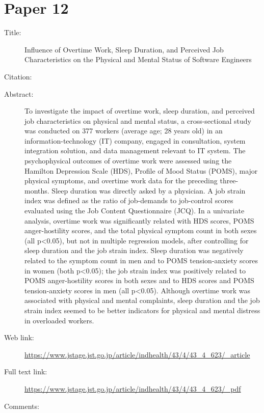 \documentclass{scrartcl}
\begin{document}
\section*{Paper 12}
\begin{description}
\item[Title:] Influence of Overtime Work, Sleep Duration, and Perceived Job Characteristics on the Physical and Mental Status of Software Engineers
\item[Citation:] \cite{nishikitani2005influence}
\item[Abstract:]
To investigate the impact of overtime work, sleep duration, and perceived job characteristics on physical and mental status, a cross-sectional study was conducted on 377 workers (average age; 28 years old) in an information-technology (IT) company, engaged in consultation, system integration solution, and data management relevant to IT system. The psychophysical outcomes of overtime work were assessed using the Hamilton Depression Scale (HDS), Profile of Mood Status (POMS), major physical symptoms, and overtime work data for the preceding three-months. Sleep duration was directly asked by a physician. A job strain index was defined as the ratio of job-demands to job-control scores evaluated using the Job Content Questionnaire (JCQ). In a univariate analysis, overtime work was significantly related with HDS scores, POMS anger-hostility scores, and the total physical symptom count in both sexes (all p<0.05), but not in multiple regression models, after controlling for sleep duration and the job strain index. Sleep duration was negatively related to the symptom count in men and to POMS tension-anxiety scores in women (both p<0.05); the job strain index was positively related to POMS anger-hostility scores in both sexes and to HDS scores and POMS tension-anxiety scores in men (all p<0.05). Although overtime work was associated with physical and mental complaints, sleep duration and the job strain index seemed to be better indicators for physical and mental distress in overloaded workers.
\item[Web link:]\url  {https://www.jstage.jst.go.jp/article/indhealth/43/4/43_4_623/_article}
\item[Full text link:]\url  {https://www.jstage.jst.go.jp/article/indhealth/43/4/43_4_623/_pdf}
\item[Comments:] 
\end{description}



\end{document}
